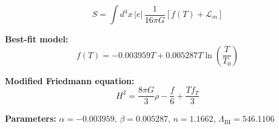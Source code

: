 
\begin{equation}
  S = \int d^4x \, |e| \, \frac{1}{16\pi G} \left[ f(T) + \mathcal{L}_m \right]
\end{equation}

\textbf{Best-fit model:}
\begin{equation}
  f(T) = -0.003959 T + 0.005287 T \ln\!\left(\frac{T}{T_0}\right)
\end{equation}

\textbf{Modified Friedmann equation:}
\begin{equation}
  H^2 = \frac{8\pi G}{3} \rho - \frac{f}{6} + \frac{T f_T}{3}
\end{equation}

\textbf{Parameters:}
$\alpha = -0.003959$, \quad
$\beta = 0.005287$, \quad
$n = 1.1662$, \quad
$\Lambda_{\text{BI}} = 546.1106$